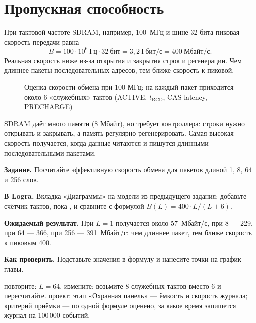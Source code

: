 \section{Пропускная способность}

При тактовой частоте SDRAM, например, 100~МГц и шине 32 бита пиковая
скорость передачи равна
\[
  B = 100 \cdot 10^6 \ \text{Гц} \cdot 32 \ \text{бит} = 3{,}2 \ \text{Гбит/с} = 400 \ \text{Мбайт/с}.
\]
Реальная скорость ниже из-за открытия и закрытия строк и регенерации.
Чем длиннее пакеты последовательных адресов, тем ближе скорость к пиковой.

\begin{figure}[H]
\centering
{}
\caption{Оценка скорости обмена при 100 МГц: на каждый пакет приходится около
6 «служебных» тактов (ACTIVE, $t_\text{RCD}$, CAS latency, PRECHARGE)}
\end{figure}

\begin{ideabox}
SDRAM даёт много памяти (8 Мбайт), но требует контроллера: строки нужно
открывать и закрывать, а память регулярно регенерировать. Самая высокая
скорость получается, когда данные читаются и пишутся длинными
последовательными пакетами.
\end{ideabox}

\begin{diybox}
\textbf{Задание.} Посчитайте эффективную скорость обмена для пакетов длиной 1, 8, 64 и 256 слов.

\textbf{В Logra.} Вкладка «Диаграммы» на модели из предыдущего задания: добавьте счётчик тактов, пока , и сравните с формулой $B(L)=400\cdot L/(L+6)$.

\textbf{Ожидаемый результат.} При $L=1$ получается около 57~Мбайт/с, при 8 --- 229, при 64 --- 366, при 256 --- 391~Мбайт/с: чем длиннее пакет, тем ближе скорость к пиковым 400.

\textbf{Как проверить.} Подставьте значения в формулу и нанесите точки на график главы.

 повторите: $L=64$.  измените: возьмите 8 служебных тактов вместо 6 и пересчитайте.  проект: этап «Охранная панель» --- ёмкость и скорость журнала; критерий приёмки --- по одной формуле оценено, за какое время запишется журнал на 100\,000 событий.
\end{diybox}

